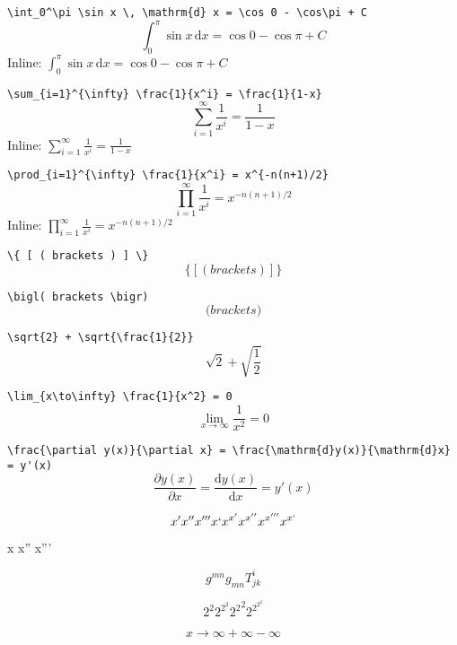 \documentclass{article}
\begin{document}
\verb|\int_0^\pi \sin x \, \mathrm{d} x = \cos 0 - \cos\pi + C|
\[ \int_0^\pi \sin x \, \mathrm{d} x = \cos 0 - \cos\pi + C \]
Inline: $\int_0^\pi \sin x \, \mathrm{d} x = \cos 0 - \cos\pi + C$

\verb|\sum_{i=1}^{\infty} \frac{1}{x^i} = \frac{1}{1-x}|
\[ \sum_{i=1}^{\infty} \frac{1}{x^i} = \frac{1}{1-x} \]
Inline: $\sum_{i=1}^{\infty} \frac{1}{x^i} = \frac{1}{1-x}$

\verb|\prod_{i=1}^{\infty} \frac{1}{x^i} = x^{-n(n+1)/2}|
\[ \prod_{i=1}^{\infty} \frac{1}{x^i} = x^{-n(n+1)/2} \]
Inline: $\prod_{i=1}^{\infty} \frac{1}{x^i} = x^{-n(n+1)/2}$

\verb|\{ [ ( brackets ) ] \}|
\[ \{ [ ( brackets ) ] \} \]

\verb|\bigl( brackets \bigr)|
\[ \bigl( brackets \bigr) \]

\verb|\sqrt{2} + \sqrt{\frac{1}{2}}|
\[ \sqrt{2} + \sqrt{\frac{1}{2}} \]

\verb|\lim_{x\to\infty} \frac{1}{x^2} = 0|
\[ \lim_{x\to\infty} \frac{1}{x^2} = 0 \]

\verb|\frac{\partial y(x)}{\partial x} = \frac{\mathrm{d}y(x)}{\mathrm{d}x} = y'(x)|
\[ \frac{\partial y(x)}{\partial x} = \frac{\mathrm{d}y(x)}{\mathrm{d}x} = y'(x) \]

\[ x' x'' x''' x` x^{x'} x^{x''} x^{x'''} x^{x`}\]

{\firatext x x'' x'''}


\[ g^{mn} g_{mn} T^{i}_{jk} \]

\[ 2^2 2^{2^2} {2^2}^2 2^{2^{2^2}} \]

\[ x \to \infty + \infty - \infty \]
\end{document}
